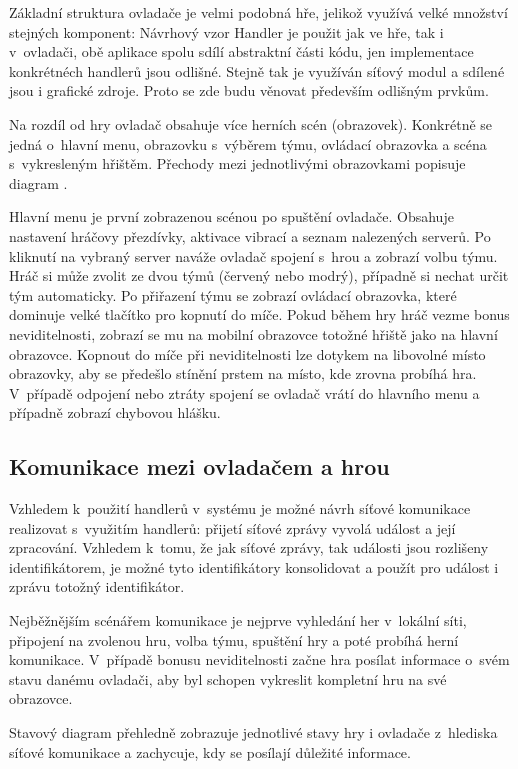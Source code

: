 \documentclass[thesis=B,czech,hidelinks]{FITthesis}[2012/06/26] %
\begin{document}
Základní struktura ovladače je velmi podobná hře, jelikož využívá velké množství stejných komponent: Návrhový vzor Handler je použit jak ve hře, tak i v~ovladači, obě aplikace spolu sdílí abstraktní části kódu, jen implementace konkrétnéch handlerů jsou odlišné. Stejně tak je využíván síťový modul a sdílené jsou i grafické zdroje. Proto se zde budu věnovat především odlišným prvkům.

Na rozdíl od hry ovladač obsahuje více herních scén (obrazovek). Konkrétně se jedná o~hlavní menu, obrazovku s~výběrem týmu, ovládací obrazovka a scéna s~vykresleným hřištěm. Přechody mezi jednotlivými obrazovkami popisuje diagram .

Hlavní menu je první zobrazenou scénou po spuštění ovladače. Obsahuje nastavení hráčovy přezdívky, aktivace vibrací a seznam nalezených serverů. Po kliknutí na vybraný server naváže ovladač spojení s~hrou a zobrazí volbu týmu. Hráč si může zvolit ze dvou týmů (červený nebo modrý), případně si nechat určit tým automaticky. Po přiřazení týmu se zobrazí ovládací obrazovka, které dominuje velké tlačítko pro kopnutí do míče. Pokud během hry hráč vezme bonus neviditelnosti, zobrazí se mu na mobilní obrazovce totožné hřiště jako na hlavní obrazovce. Kopnout do míče při neviditelnosti lze dotykem na libovolné místo obrazovky, aby se předešlo stínění prstem na místo, kde zrovna probíhá hra. V~případě odpojení nebo ztráty spojení se ovladač vrátí do hlavního menu a případně zobrazí chybovou hlášku.

\subsection{Komunikace mezi ovladačem a hrou}

Vzhledem k~použití handlerů v~systému je možné návrh síťové komunikace realizovat s~využitím handlerů: přijetí síťové zprávy vyvolá událost a její zpracování. Vzhledem k~tomu, že jak síťové zprávy, tak události jsou rozlišeny identifikátorem, je možné tyto identifikátory konsolidovat a použít pro událost i zprávu totožný identifikátor. 

Nejběžnějším scénářem komunikace je nejprve vyhledání her v~lokální síti, připojení na zvolenou hru, volba týmu, spuštění hry a poté probíhá herní komunikace. V~případě bonusu neviditelnosti začne hra posílat informace o~svém stavu danému ovladači, aby byl schopen vykreslit kompletní hru na své obrazovce.

Stavový diagram  přehledně zobrazuje jednotlivé stavy hry i ovladače z~hlediska síťové komunikace a zachycuje, kdy se posílají důležité informace.
\end{document}

